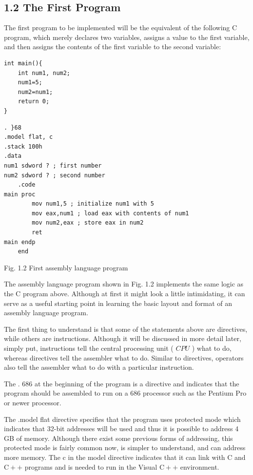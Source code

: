 \documentclass[10pt]{book}
\begin{document}
\subsection*{1.2 The First Program}
The first program to be implemented will be the equivalent of the following C program, which merely declares two variables, assigns a value to the first variable, and then assigns the contents of the first variable to the second variable:

\begin{verbatim}
int main(){
    int num1, num2;
    num1=5;
    num2=num1;
    return 0;
}
\end{verbatim}

\begin{verbatim}
. }68
.model flat, c
.stack 100h
.data
num1 sdword ? ; first number
num2 sdword ? ; second number
    .code
main proc
        mov num1,5 ; initialize num1 with 5
        mov eax,num1 ; load eax with contents of num1
        mov num2,eax ; store eax in num2
        ret
main endp
    end
\end{verbatim}

Fig. 1.2 First assembly language program

The assembly language program shown in Fig. 1.2 implements the same logic as the C program above. Although at first it might look a little intimidating, it can serve as a useful starting point in learning the basic layout and format of an assembly language program.

The first thing to understand is that some of the statements above are directives, while others are instructions. Although it will be discussed in more detail later, simply put, instructions tell the central processing unit ( $C P U$ ) what to do, whereas directives tell the assembler what to do. Similar to directives, operators also tell the assembler what to do with a particular instruction.

The . 686 at the beginning of the program is a directive and indicates that the program should be assembled to run on a 686 processor such as the Pentium Pro or newer processor.

The .model flat directive specifies that the program uses protected mode which indicates that 32-bit addresses will be used and thus it is possible to address 4 GB of memory. Although there exist some previous forms of addressing, this protected mode is fairly common now, is simpler to understand, and can address more memory. The c in the model directive indicates that it can link with C and $\mathrm{C}++$ programs and is needed to run in the Visual $\mathrm{C}++$ environment.
\end{document}
